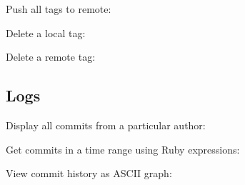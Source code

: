 \begin{flushleft}
\end{flushleft}

\begin{flushleft}
	Push all tags to remote:
\end{flushleft}

\begin{flushleft}
\end{flushleft}

\begin{flushleft}
	Delete a local tag:
\end{flushleft}

\begin{flushleft}
\end{flushleft}

\begin{flushleft}
	Delete a remote tag:
\end{flushleft}

\begin{flushleft}
\end{flushleft}


\subsection{Logs}\label{git-log}

\begin{flushleft}
	Display all commits from a particular author:
\end{flushleft}

\begin{flushleft}
\end{flushleft}

\begin{flushleft}
	Get commits in a time range using Ruby expressions:
\end{flushleft}

\begin{flushleft}
\end{flushleft}

\begin{flushleft}
	View commit history as ASCII graph:
\end{flushleft}

